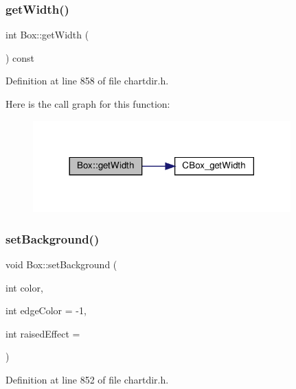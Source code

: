 \subsubsection{\texorpdfstring{get\+Width()}{getWidth()}}
{\footnotesize\ttfamily int Box\+::get\+Width (\begin{DoxyParamCaption}{ }\end{DoxyParamCaption}) const\hspace{0.3cm}{\ttfamily [inline]}}



Definition at line 858 of file chartdir.\+h.

Here is the call graph for this function\+:
\nopagebreak
\begin{figure}[H]
\begin{center}
\leavevmode
\includegraphics[width=281pt]{class_box_a4feb8db8b03bd71a7235d33ec96c3725_cgraph}
\end{center}
\end{figure}
\mbox{\label{class_box_ac1dd2cb9848de34cf3687a25821fd228}} 
\subsubsection{\texorpdfstring{set\+Background()}{setBackground()}}
{\footnotesize\ttfamily void Box\+::set\+Background (\begin{DoxyParamCaption}\item[{int}]{color,  }\item[{int}]{edge\+Color = {\ttfamily -\/1},  }\item[{int}]{raised\+Effect = {} }\end{DoxyParamCaption})\hspace{0.3cm}{\ttfamily [inline]}}



Definition at line 852 of file chartdir.\+h.

